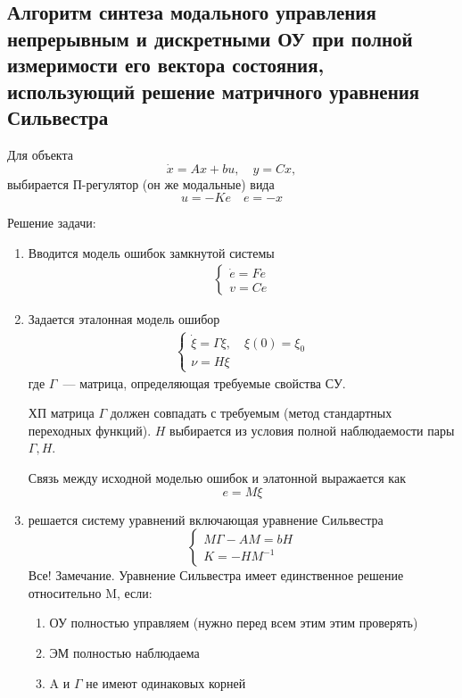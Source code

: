 \subsection{Алгоритм 	синтеза модального управления непрерывным 	и дискретными ОУ при полной измеримости его вектора состояния, использующий решение матричного уравнения Сильвестра}

Для объекта
\begin{equation}
    \dot x = A x + bu, \quad y = Cx,
\end{equation}
выбирается П-регулятор (он же модальные) вида
\begin{equation}
    u = - K e \quad e = - x
\end{equation}

Решение задачи:
\begin{enumerate}
    \item Вводится модель ошибок замкнутой системы
    \begin{gather}
        \begin{cases}
            \dot e = F e \\
            v = C e
        \end{cases}
    \end{gather}
    \item Задается эталонная модель ошибор
    \begin{gather}
        \begin{cases}
            \dot \xi = \Gamma \xi, \quad \xi(0) = \xi_0 \\
            \nu = H \xi
        \end{cases}
    \end{gather}
    где $\Gamma$~--- матрица, определяющая требуемые свойства СУ.
    
    ХП матрица $\Gamma$ должен совпадать с требуемым (метод стандартных переходных функций).
    $H$ выбирается из условия полной наблюдаемости пары $\Gamma, H$.
    
    Связь между исходной моделью ошибок и элатонной выражается как
    \begin{equation}
        e = M \xi
    \end{equation}
    
    \item решается систему уравнений включающая уравнение Сильвестра
    \begin{equation}
        \begin{cases}
        M \Gamma - AM = bH \\
        K = - H M^{-1}
        \end{cases}
    \end{equation}
    Все!
    Замечание. Уравнение Сильвестра имеет единственное решение относительно M, если:
    \begin{enumerate}
        \item ОУ полностью управляем (нужно перед всем этим этим проверять)
        \item ЭМ полностью наблюдаема
        \item A и $\Gamma$ не имеют одинаковых корней
    \end{enumerate}
\end{enumerate}


